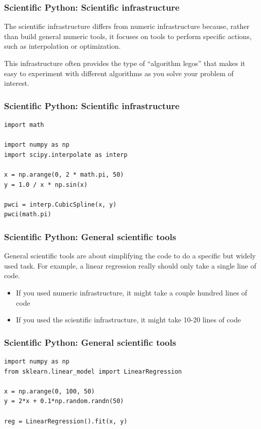 \documentclass[
    xcolor={svgnames,dvipsnames},
    hyperref={colorlinks, citecolor=DeepPink4, linkcolor=DarkRed, urlcolor=DarkBlue}
]{beamer}  %
\newcommand{\1}{\mathbbm 1}
\begin{document}
\begin{frame}[fragile]
    \frametitle{Scientific Python: Scientific infrastructure}

    The scientific infrastructure differs from numeric infrastructure because, rather than build
    general numeric tools, it focuses on tools to perform specific actions, such as interpolation
    or optimization.

    This infrastructure often provides the type of ``algorithm legos'' that makes it easy to
    experiment with different algorithms as you solve your problem of interest.

\end{frame}

\begin{frame}[fragile]
    \frametitle{Scientific Python: Scientific infrastructure}
    \begin{verbatim}
import math

import numpy as np
import scipy.interpolate as interp

x = np.arange(0, 2 * math.pi, 50)
y = 1.0 / x * np.sin(x)

pwci = interp.CubicSpline(x, y)
pwci(math.pi)

    \end{verbatim}

\end{frame}

\begin{frame}[fragile]
    \frametitle{Scientific Python: General scientific tools}

    General scientific tools are about simplifying the code to do a specific but widely used task.
    For example, a linear regression really should only take a single line of code.

    \begin{itemize}
        \item If you used numeric infrastructure, it might take a couple hundred lines of code
        \item If you used the scientific infrastructure, it might take 10-20 lines of code
    \end{itemize}

\end{frame}

\begin{frame}[fragile]
    \frametitle{Scientific Python: General scientific tools}

    \begin{verbatim}
import numpy as np
from sklearn.linear_model import LinearRegression

x = np.arange(0, 100, 50)
y = 2*x + 0.1*np.random.randn(50)

reg = LinearRegression().fit(x, y)

    \end{verbatim}

\end{frame}
\end{document}
